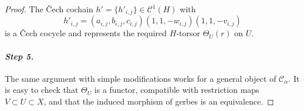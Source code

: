 \documentclass{amsart}
\numberwithin{equation}{subsection}
\theoremstyle{remark}
\newtheorem{remark}[theorem]{Remark}
\theoremstyle{remark}
\newcommand{\cC}{\mathcal{C}}
\begin{document}
\begin{proof}
 The \v Cech cochain $h' =\{h'_{i,j}\} \in \cC^1(H)$ with
 \begin{equation*}
   h'_{i,j} = (a_{i,j}, b_{i,j}, c_{i,j})(1,1, - w_{i,j})(1,1,- v_{i,j})
 \end{equation*}
 is a \v Cech cocycle and represents the required $H$-torsor $\Theta_U(r)$ on $U$.\vspace*{1em} 

\paragraph{\textit{Step 5.}} The same argument with simple modifications works for a
general object of $\cC_{\alpha}$.
It is easy to check that $\Theta_U$ is a functor, compatible with restriction maps $V\subset
 U\subset X$, and that the induced morphism of gerbes is an equivalence.
\end{proof}

\end{document}

